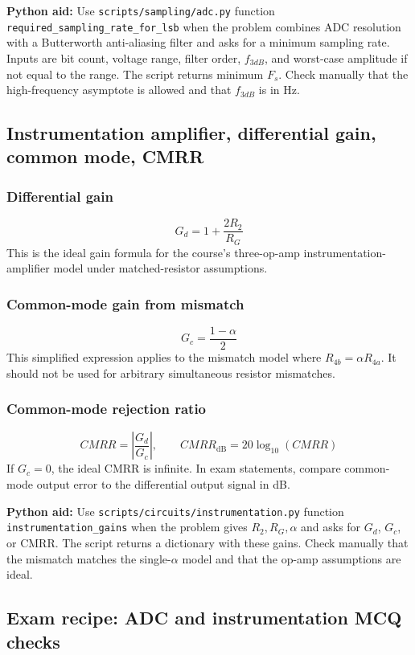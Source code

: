 \textbf{Python aid:} Use \texttt{scripts/sampling/adc.py} function \texttt{required\_sampling\_rate\_for\_lsb} when the problem combines ADC resolution with a Butterworth anti-aliasing filter and asks for a minimum sampling rate. Inputs are bit count, voltage range, filter order, \(f_{3dB}\), and worst-case amplitude if not equal to the range. The script returns minimum \(F_s\). Check manually that the high-frequency asymptote is allowed and that \(f_{3dB}\) is in Hz.

\subsection{Instrumentation amplifier, differential gain, common mode, CMRR}

\subsubsection{Differential gain}
\[
G_d=1+\frac{2R_2}{R_G}
\]
This is the ideal gain formula for the course's three-op-amp instrumentation-amplifier model under matched-resistor assumptions.

\subsubsection{Common-mode gain from mismatch}
\[
G_c=\frac{1-\alpha}{2}
\]
This simplified expression applies to the mismatch model where \(R_{4b}=\alpha R_{4a}\). It should not be used for arbitrary simultaneous resistor mismatches.

\subsubsection{Common-mode rejection ratio}
\[
CMRR=\left|\frac{G_d}{G_c}\right|,\qquad
CMRR_{\mathrm{dB}}=20\log_{10}(CMRR)
\]
If \(G_c=0\), the ideal CMRR is infinite. In exam statements, compare common-mode output error to the differential output signal in dB.

\textbf{Python aid:} Use \texttt{scripts/circuits/instrumentation.py} function \texttt{instrumentation\_gains} when the problem gives \(R_2,R_G,\alpha\) and asks for \(G_d\), \(G_c\), or CMRR. The script returns a dictionary with these gains. Check manually that the mismatch matches the single-\(\alpha\) model and that the op-amp assumptions are ideal.

\subsection{Exam recipe: ADC and instrumentation MCQ checks}

